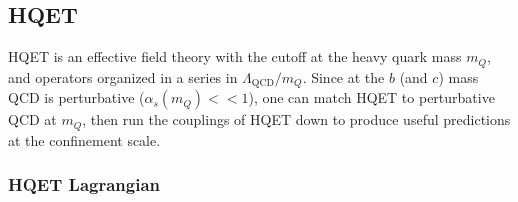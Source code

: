 
\subsection{HQET}

HQET is an effective field theory with the cutoff at the heavy quark mass $m_Q$, and operators organized in a series in $\Lambda_{\text{QCD}}/m_Q$. Since at the $b$ (and $c$) mass QCD is perturbative ($\alpha_s(m_Q) << 1$), one can match HQET to perturbative QCD at $m_Q$, then run the couplings of HQET down to produce useful predictions at the confinement scale.


\subsubsection{HQET Lagrangian}

